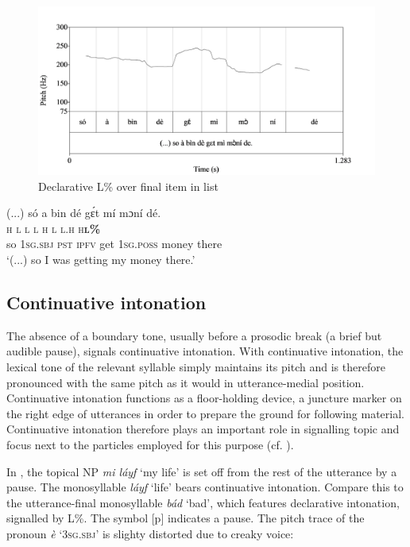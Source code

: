 \begin{figure}
\caption{Declarative L\% over final item in list}
\label{fig:key:3.38}
\includegraphics[height=.3\textheight]{figures/yakpomod-img40.png}
\end{figure}

  
 


\ea%
    \label{ex:key:91}
    \glll   (...)  só  a    bin  dé  gɛ́t  mí    mɔní  dé.\\
  \textsc{h}  \textsc{l}    \textsc{l}  \textsc{l}  \textsc{h}  \textsc{l}    \textsc{l.h}    \textsc{h}\textbf{\textsc{l\%}}\\
  so  \textsc{1sg.sbj}  \textsc{pst}  \textsc{ipfv}  get  \textsc{1sg.poss}  money  there\\
\glt ‘(...) so I was getting my money there.’
\z


\subsection{Continuative intonation}\label{sec:3.4.4}

The absence of a boundary tone, usually before a prosodic break (a brief but audible pause), signals continuative intonation. With continuative intonation, the lexical tone of the relevant syllable simply maintains its pitch and is therefore pronounced with the same pitch as it would in utterance-medial position. Continuative intonation functions as a floor-holding device, a juncture marker on the right edge of utterances in order to prepare the ground for following material. Continuative intonation therefore plays an important role in signalling topic and focus next to the particles employed for this purpose (cf. ). 


In , the topical \textsc{NP} \textit{mi láyf} ‘my life’ is set off from the rest of the utterance by a pause. The monosyllable \textit{láyf} ‘life’ bears continuative intonation. Compare this to the utterance-final monosyllable \textit{bád} ‘bad’, which features declarative intonation, signalled by L\%. The symbol [p] indicates a pause. The pitch trace of the pronoun \textit{è} ‘\textsc{3sg.sbj}’ is slighty distorted due to creaky voice: 


